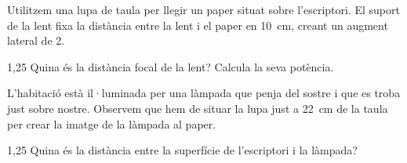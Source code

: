 Utilitzem una lupa de taula per llegir un paper situat sobre l'escriptori. El suport de la lent fixa la distància entre la lent i el paper en 10~cm, creant un augment lateral de 2.


\begin{apartat}{1,25}
Quina és la distància focal de la lent? Calcula la seva potència.
\end{apartat}

L'habitació està il·luminada per una làmpada que penja del sostre i que es troba just sobre nostre. Observem que hem de situar la lupa just a 22~cm de la taula per crear la imatge de la làmpada al paper.

\begin{apartat}{1,25}
Quina és la distància entre la superfície de l'escriptori i la làmpada?
\end{apartat}
